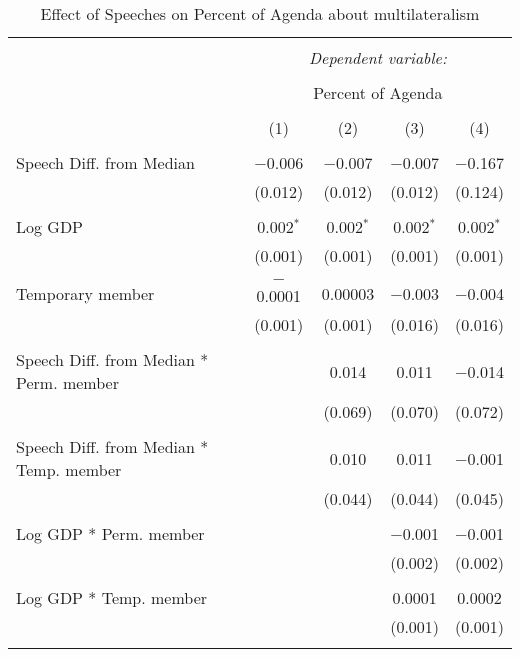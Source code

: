 
\begin{table}[!htbp] \centering 
  \caption{Effect of Speeches on Percent of Agenda about  multilateralism} 
  \label{} 
\begin{tabular}{@{\extracolsep{5pt}}lcccc} 
\\[-1.8ex]\hline 
\hline \\[-1.8ex] 
 & \multicolumn{4}{c}{\textit{Dependent variable:}} \\ 
\cline{2-5} 
\\[-1.8ex] & \multicolumn{4}{c}{Percent of Agenda} \\ 
\\[-1.8ex] & (1) & (2) & (3) & (4)\\ 
\hline \\[-1.8ex] 
 Speech Diff. from Median & $-$0.006 & $-$0.007 & $-$0.007 & $-$0.167 \\ 
  & (0.012) & (0.012) & (0.012) & (0.124) \\ 
  & & & & \\ 
 Log GDP & 0.002$^{*}$ & 0.002$^{*}$ & 0.002$^{*}$ & 0.002$^{*}$ \\ 
  & (0.001) & (0.001) & (0.001) & (0.001) \\ 
  & & & & \\ 
 Temporary member & $-$0.0001 & 0.00003 & $-$0.003 & $-$0.004 \\ 
  & (0.001) & (0.001) & (0.016) & (0.016) \\ 
  & & & & \\ 
 Speech Diff. from Median * Perm. member &  & 0.014 & 0.011 & $-$0.014 \\ 
  &  & (0.069) & (0.070) & (0.072) \\ 
  & & & & \\ 
 Speech Diff. from Median * Temp. member &  & 0.010 & 0.011 & $-$0.001 \\ 
  &  & (0.044) & (0.044) & (0.045) \\ 
  & & & & \\ 
 Log GDP * Perm. member &  &  & $-$0.001 & $-$0.001 \\ 
  &  &  & (0.002) & (0.002) \\ 
  & & & & \\ 
 Log GDP * Temp. member &  &  & 0.0001 & 0.0002 \\ 
  &  &  & (0.001) & (0.001) \\ 
  & & & & \\ 

\end{tabular}
\end{table}
